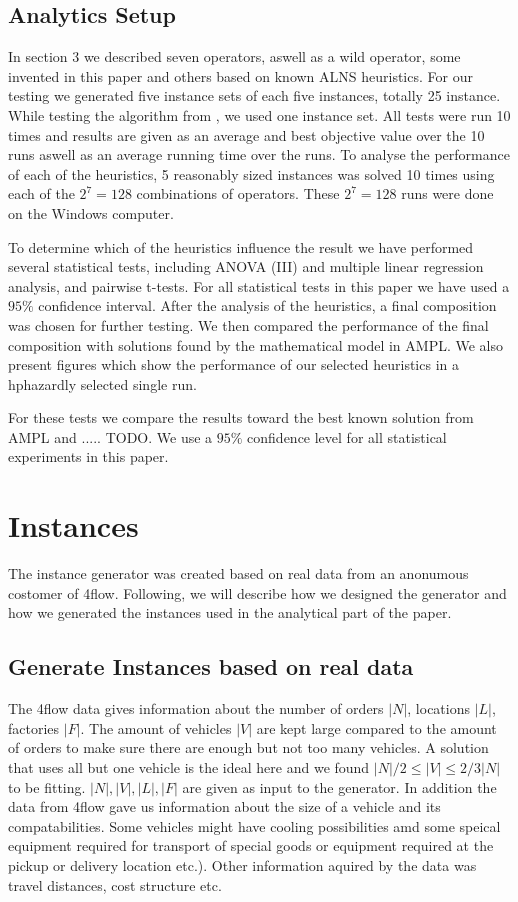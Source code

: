 \documentclass[../main.tex]{subfiles}
\begin{document}
\subsection{Analytics Setup}
\label{sec:analy}
In section 3 we described seven operators, aswell as a wild operator, some invented in this paper and others based on known ALNS heuristics. 
For our testing we generated five instance sets of each five instances, totally 25 instance.
While testing the algorithm from , we used one instance set. 
All tests were run 10 times and results are given as an average and best objective value over the 10 runs aswell as an average running time over the runs.
To analyse the performance of each of the heuristics, 5 reasonably sized instances was solved 10 times using each of the $2^7 = 128$ combinations of operators.
These $2^7=128$ runs were done on the Windows computer. \par
To determine which of the heuristics influence the result we have performed several statistical tests, including ANOVA (III) and multiple linear regression analysis, and pairwise t-tests. 
For all statistical tests in this paper we have used a $95\%$ confidence interval.
After the analysis of the heuristics, a final composition was chosen for further testing.
We then compared the performance of the final composition with solutions found by the mathematical model in AMPL. We also present figures which show the performance of our selected heuristics in a hphazardly selected single run.

For these tests we compare the results toward the best known solution from AMPL and ..... TODO.
We use a $95\%$ confidence level for all statistical experiments in this paper.

\section{Instances}
\label{sec:ins}
The instance generator was created based on real data from an anonumous costomer of 4flow. 
Following, we will describe how we designed the generator and how we generated the instances used in the analytical part of the paper.

\subsection{Generate Instances based on real data}
\label{sec:data}
The 4flow data gives information about the number of orders $|N|$, locations $|L|$, factories $|F|$. 
The amount of vehicles $|V|$ are kept large compared to the amount of orders to make sure there are enough but not too many vehicles. 
A solution that uses all but one vehicle is the ideal here and we found $|N|/2 \leq |V| \leq 2/3 |N|$ to be fitting.
$|N|, |V|, |L|, |F|$ are given as input to the generator.
In addition the data from 4flow gave us information about the size of a vehicle and its compatabilities. 
Some vehicles might have cooling possibilities amd some speical equipment required for transport of special goods or equipment required at the pickup or delivery location etc.).
Other information aquired by the data was travel distances, cost structure etc.
\end{document}
